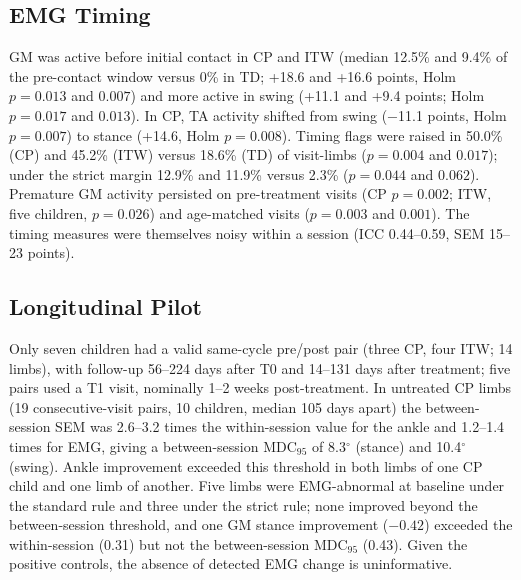 \documentclass[conference]{IEEEtran}
\newcommand{\rone}[1]{{\color{rI}#1}}
\newcommand{\rtwo}[1]{{\color{rII}#1}}
\newcommand{\rthree}[1]{{\color{rIII}#1}}
\newcommand{\rone}[1]{#1}
\newcommand{\rtwo}[1]{#1}
\newcommand{\rthree}[1]{#1}
\begin{document}
\begin{table}[t]
\centering
\caption{\rtwo{Positive controls: \% of 43 TD visit-limbs flagged (EMG flag; $^b$ankle flag) after a known change. Ranges: muscles and shift directions. $^a$Same change between two visits exceeding the change threshold}}
\label{tab:controls}
\scriptsize
\setlength{\tabcolsep}{3pt}
\rtwo{}
\end{table}

\subsection{EMG Timing}
\rthree{GM was active before initial contact in CP and ITW (median 12.5\% and 9.4\% of the pre-contact window versus 0\% in TD; +18.6 and +16.6 points, Holm $p=0.013$ and $0.007$) and more active in swing (+11.1 and +9.4 points; Holm $p=0.017$ and $0.013$). In CP, TA activity shifted from swing ($-$11.1 points, Holm $p=0.007$) to stance (+14.6, Holm $p=0.008$). Timing flags were raised in 50.0\% (CP) and 45.2\% (ITW) versus 18.6\% (TD) of visit-limbs ($p=0.004$ and $0.017$); under the strict margin 12.9\% and 11.9\% versus 2.3\% ($p=0.044$ and $0.062$).} \rtwo{Premature GM activity persisted on pre-treatment visits (CP $p=0.002$; ITW, five children, $p=0.026$) and age-matched visits ($p=0.003$ and $0.001$).} \rthree{The timing measures were themselves noisy within a session (ICC 0.44--0.59, SEM 15--23 points).}

\subsection{Longitudinal Pilot}
\rone{Only seven children had a valid same-cycle pre/post pair (three CP, four ITW; 14 limbs), with follow-up 56--224 days after T0 and 14--131 days after treatment; five pairs used a T1 visit, nominally 1--2 weeks post-treatment.} \rthree{In untreated CP limbs (19 consecutive-visit pairs, 10 children, median 105 days apart) the between-session SEM was 2.6--3.2 times the within-session value for the ankle and 1.2--1.4 times for EMG, giving a between-session MDC$_{95}$ of 8.3$^\circ$ (stance) and 10.4$^\circ$ (swing).} \rone{Ankle improvement exceeded this threshold in both limbs of one CP child and one limb of another. Five limbs were EMG-abnormal at baseline under the standard rule and three under the strict rule; none improved beyond the between-session threshold, and one GM stance improvement ($-0.42$) exceeded the within-session (0.31) but not the between-session MDC$_{95}$ (0.43). Given the positive controls, the absence of detected EMG change is uninformative.}
\end{document}
